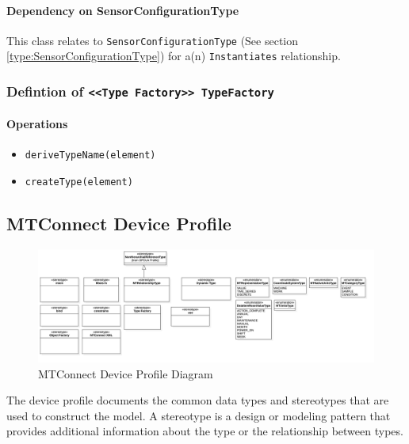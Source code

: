 \paragraph{Dependency on SensorConfigurationType}

This class relates to \texttt{SensorConfigurationType} (See section \ref{type:SensorConfigurationType}) for a(n) \texttt{Instantiates} relationship.

\FloatBarrier
\subsubsection{Defintion of \texttt{<<Type Factory>> TypeFactory}} \label{type:TypeFactory}

\FloatBarrier



\paragraph{Operations}
\begin{itemize}
  \item \texttt{deriveTypeName(element)}
  \item \texttt{createType(element)}
\end{itemize}
\FloatBarrier
\subsection{MTConnect Device Profile}

\begin{figure}[ht]
  \centering
    \includegraphics[width=1.0\textwidth]{./diagrams/MTConnectDeviceProfile.png}
  \caption{MTConnect Device Profile Diagram}
  \label{fig:MTConnectDeviceProfile}
\end{figure}

\FloatBarrier


The device profile documents the common data types and stereotypes that are 
used to construct the model. A stereotype is a design or modeling pattern that 
provides additional information about the type or the relationship between types. 

